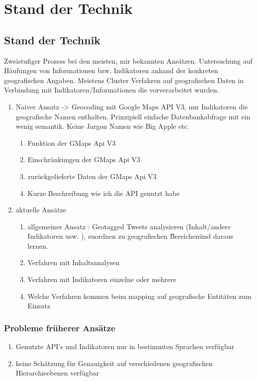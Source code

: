 \chapter{Stand der Technik} 

	\section{Stand der Technik}
		Zweistufiger Prozess bei den meisten, mir bekannten Ansätzen.
		Untersuchung auf Häufungen von Informationen bzw. Indikatoren anhand der konkreten geografischen Angaben. Meistens Cluster Verfahren auf geografischen Daten in Verbindung mit Indikatoren/Informationen die vorverarbeitet wurden.

		\begin{enumerate}
			\item Naiver Ansatz -> Geocoding mit Google Maps API V3, nur Indikatoren die geografische Namen enthalten. 
					Prinzipiell einfache Datenbankabfrage mit ein wenig semantik. 
					Keine Jargon Namen wie Big Apple etc.
				\begin{enumerate}
					\item Funktion der GMaps Api V3
					\item Einschränkungen der GMaps Api V3
					\item zurückgelieferte Daten der GMaps Api V3
					\item Kurze Beschreibung wie ich die API genutzt habe
				\end{enumerate}
			\item aktuelle Ansätze
				\begin{enumerate}
					\item{ 
					allgemeiner Ansatz : Geotagged Tweets analysieren (Inhalt/andere Indikatoren usw. ), zuordnen zu geografischen \"Bereichen\" und daraus lernen.}
					\item Verfahren mit Inhaltsanalysen
					\item Verfahren mit Indikatoren einzelne oder mehrere
					\item Welche Verfahren kommen beim mapping auf  geografische Entitäten zum Einsatz
				\end{enumerate}
		\end{enumerate}

		\subsection{Probleme früherer Ansätze}
			\begin{enumerate}
				\item{Genutzte API's und Indikatoren nur in bestimmten Sprachen verfügbar}
				\item{keine Schätzung für Genauigkeit auf verschiedenen geografischen Hierarchieebenen verfügbar}  
			\end{enumerate}

	
	
	

	
